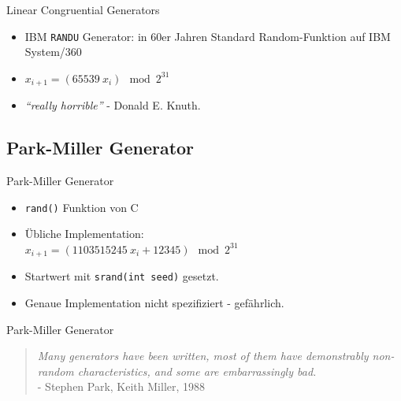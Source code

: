 \documentclass{beamer}
\begin{document}
\begin{frame}{Linear Congruential Generators}
	\begin{itemize}
		\item IBM \texttt{RANDU} Generator: in 60er Jahren Standard Random-Funktion auf IBM System/360
		\item $x_{i+1} = \left( 65539 \: x_i \right) \mod{2^{31}}$ 
		\item<3-> \textit{``really horrible''} - Donald E. Knuth.
	\end{itemize}
\end{frame}

\subsection{Park-Miller Generator}
\begin{frame}{Park-Miller Generator}

	\begin{itemize}
		\item \texttt{rand()} Funktion von C
		\item Übliche Implementation: \\ $x_{i+1} =  \left( 1103515245 \: x_i + 12345\right) \mod{2^{31}}$
		\item Startwert mit \texttt{srand(int seed)} gesetzt. 
		\item Genaue Implementation nicht spezifiziert - gefährlich.
	\end{itemize}
\end{frame}

\begin{frame}{Park-Miller Generator}
	\begin{quote}
		\textit{Many generators have been written, most of them have demonstrably non-random characteristics, and some are embarrassingly bad.} \\ - Stephen Park, Keith Miller, 1988
	\end{quote}	
\end{frame}
\end{document}
